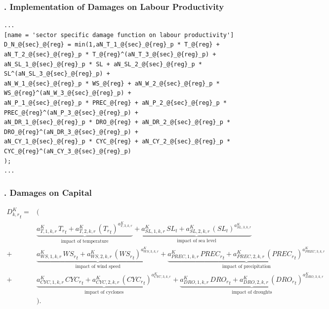 \documentclass[11pt,aspectratio=169]{beamer}
\begin{document}
\begin{frame}[fragile]
\frametitle{{\thesection.\thesubsection} Implementation of Damages on Labour Productivity}

\begin{lstlisting}[frame = single]
...
[name = 'sector specific damage function on labour productivity']
D_N_@{sec}_@{reg} = min(1,aN_T_1_@{sec}_@{reg}_p * T_@{reg} + aN_T_2_@{sec}_@{reg}_p * T_@{reg}^(aN_T_3_@{sec}_@{reg}_p) + 
aN_SL_1_@{sec}_@{reg}_p * SL + aN_SL_2_@{sec}_@{reg}_p * SL^(aN_SL_3_@{sec}_@{reg}_p) +
aN_W_1_@{sec}_@{reg}_p * WS_@{reg} + aN_W_2_@{sec}_@{reg}_p * WS_@{reg}^(aN_W_3_@{sec}_@{reg}_p) + 
aN_P_1_@{sec}_@{reg}_p * PREC_@{reg} + aN_P_2_@{sec}_@{reg}_p * PREC_@{reg}^(aN_P_3_@{sec}_@{reg}_p) + 
aN_DR_1_@{sec}_@{reg}_p * DRO_@{reg} + aN_DR_2_@{sec}_@{reg}_p * DRO_@{reg}^(aN_DR_3_@{sec}_@{reg}_p) +
aN_CY_1_@{sec}_@{reg}_p * CYC_@{reg} + aN_CY_2_@{sec}_@{reg}_p * CYC_@{reg}^(aN_CY_3_@{sec}_@{reg}_p)
);
...
\end{lstlisting}
\end{frame}



\begin{frame}
\frametitle{{\thesection.\thesubsection} Damages on Capital}
\scriptsize
\begin{align*}
{{D^{K}_{k,r}}_{t}}=& \Big( \nonumber \\
&\underbrace{{{a^{K}_{T,1,k,r}}} \, {{T_{r}}_{t}}+{{a^{K}_{T,2,k,r}}}\, \left({T_{r}}_{t}\right)^{a^{K}_{T,3,k,r}}}_{\mbox{impact of temperature}}+ \underbrace{{{a^{K}_{SL,1,k,r}}}\, {{SL}_{t}}+{{a^{K}_{SL,2,k,r}}}\, \left({SL}_{t}\right)^{{{a^{K}_{SL,3,k,r}}}}}_{\mbox{impact of sea level}} \nonumber \\
+ & \underbrace{{{a^{K}_{WS,1,k,r}}}\, {{WS_{r}}_{t}}+{{a^{K}_{WS,2,k,r}}}\, \left({WS_{r}}_{t}\right)^{{{a^{K}_{WS,3,k,r}}}}}_{\mbox{impact of wind speed}}
+ \underbrace{{{a^{K}_{PREC,1,k,r}}} \, {{PREC_{r}}_{t}}+{{a^{K}_{PREC,2,k,r}}}\, \left({PREC_{r}}_{t}\right)^{{{a^{K}_{PREC,3,k,r}}}}}_{\mbox{impact of precipitation}} \nonumber \\
+ & \underbrace{{{a^{K}_{CYC,1,k,r}}}\, {{CYC_{r}}_{t}}+{{a^{K}_{CYC,2,k,r}}}\, \left({CYC_{r}}_{t}\right)^{{{a^{K}_{CYC,3,k,r}}}}}_{\mbox{impact of cyclones}}
+ \underbrace{{{a^{K}_{DRO,1,k,r}}} \, {{DRO_{r}}_{t}}+{{a^{K}_{DRO,2,k,r}}}\, \left({DRO_{r}}_{t}\right)^{{{a^{K}_{DRO,3,k,r}}}}}_{\mbox{impact of droughts}} \nonumber \\
&\Big).
\end{align*}
\end{frame}
\end{document}
